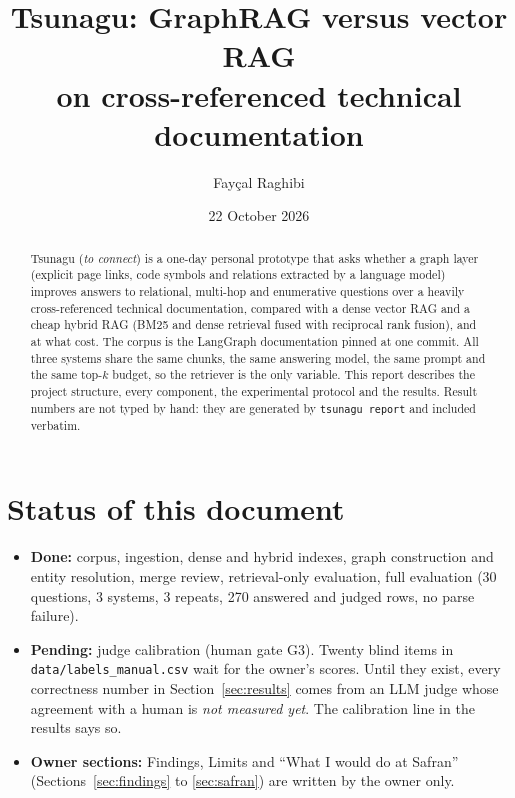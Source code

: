 \documentclass[11pt,a4paper]{article}
\title{Tsunagu: GraphRAG versus vector RAG\\on cross-referenced technical documentation}
\author{Fay\c{c}al Raghibi}
\date{22 October 2026}
\newcommand{\code}[1]{\texttt{#1}}
\begin{document}
\maketitle
\sloppy

\begin{abstract}
Tsunagu (\emph{to connect}) is a one-day personal prototype that asks whether a graph layer
(explicit page links, code symbols and relations extracted by a language model) improves
answers to relational, multi-hop and enumerative questions over a heavily cross-referenced
technical documentation, compared with a dense vector RAG and a cheap hybrid RAG (BM25 and
dense retrieval fused with reciprocal rank fusion), and at what cost. The corpus is the
LangGraph documentation pinned at one commit. All three systems share the same chunks, the
same answering model, the same prompt and the same top-$k$ budget, so the retriever is the
only variable. This report describes the project structure, every component, the experimental
protocol and the results. Result numbers are not typed by hand: they are generated by
\code{tsunagu report} and included verbatim.
\end{abstract}

\tableofcontents
\newpage

\section{Status of this document}

\begin{itemize}
  \item \textbf{Done:} corpus, ingestion, dense and hybrid indexes, graph construction and
  entity resolution, merge review, retrieval-only evaluation, full evaluation (30 questions,
  3 systems, 3 repeats, 270 answered and judged rows, no parse failure).
  \item \textbf{Pending:} judge calibration (human gate G3). Twenty blind items in
  \code{data/labels\_manual.csv} wait for the owner's scores. Until they exist, every
  correctness number in Section~\ref{sec:results} comes from an LLM judge whose agreement
  with a human is \emph{not measured yet}. The calibration line in the results says so.
  \item \textbf{Owner sections:} Findings, Limits and ``What I would do at Safran''
  (Sections~\ref{sec:findings} to \ref{sec:safran}) are written by the owner only.
\end{itemize}
\end{document}
